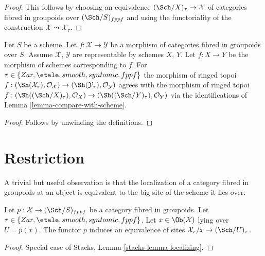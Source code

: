 \begin{proof}
This follows by choosing an equivalence
$(\Sch/X)_\tau \to \mathcal{X}$ of categories fibred in groupoids
over $(\Sch/S)_{fppf}$ and using the functoriality of
the construction $\mathcal{X} \leadsto \mathcal{X}_\tau$.
\end{proof}

\begin{lemma}
\label{lemma-compare-with-morphism-of-schemes}
Let $S$ be a scheme. Let $f : \mathcal{X} \to \mathcal{Y}$ be a morphism
of categories fibred in groupoids over $S$.
Assume $\mathcal{X}$, $\mathcal{Y}$ are representable by schemes
$X$, $Y$. Let $f : X \to Y$ be the morphism of schemes corresponding
to $f$. For $\tau \in \{Zar,\linebreak[0] \etale,\linebreak[0]
smooth,\linebreak[0] syntomic,\linebreak[0] fppf\}$
the morphism of ringed topoi
$f : (\Sh(\mathcal{X}_\tau), \mathcal{O}_\mathcal{X}) \to
(\Sh(\mathcal{Y}_\tau), \mathcal{O}_\mathcal{Y})$
agrees with the morphism of ringed topoi
$f : (\Sh((\Sch/X)_\tau), \mathcal{O}_X) \to 
(\Sh((\Sch/Y)_\tau), \mathcal{O}_Y)$ via the identifications of
Lemma \ref{lemma-compare-with-scheme}.
\end{lemma}

\begin{proof}
Follows by unwinding the definitions.
\end{proof}




\section{Restriction}
\label{section-restriction}


\noindent
A trivial but useful observation is that the localization
of a category fibred in groupoids at an object
is equivalent to the big site of the scheme it lies over.

\begin{lemma}
\label{lemma-localizing}
Let $p : \mathcal{X} \to (\Sch/S)_{fppf}$ be a category fibred
in groupoids. Let $\tau \in \{Zar, \etale, smooth, syntomic, fppf\}$.
Let $x \in \Ob(\mathcal{X})$ lying over $U = p(x)$.
The functor $p$ induces an equivalence of sites
$\mathcal{X}_\tau/x \to (\Sch/U)_\tau$.
\end{lemma}

\begin{proof}
Special case of Stacks, Lemma \ref{stacks-lemma-localizing}.
\end{proof}

